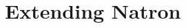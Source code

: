 \documentclass[letterpaper,12pt,oneside]{book}
\begin{document}
\part{Extending Natron}
\end{document}
